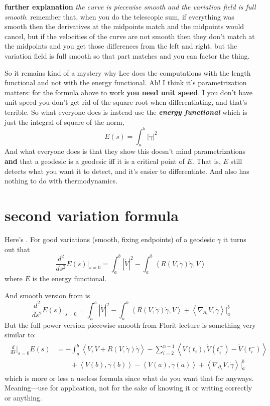 \textbf{further explanation} \textit{the curve is piecewise smooth and the variation field is full smooth}. remember that, when you do the telescopic sum, if everything was smooth then the derivatives at the midpoints match and the midpoints would cancel, but if the velocities of the curve are not smooth then they don't match at the midpoints and you get those differences from the left and right. but the variation field is full smooth so that part matches and you can factor the thing.

So it remains kind of a mystery why Lee does the computations with the length functional and not with the energy functional. Ah! I think it's parametrization matters: for the formula above to work \textbf{you need unit speed}. I you don't have unit speed you don't get rid of the square root when differentiating, and that's terrible. So what everyone does is instead use the \textit{\textbf{energy functional}} which is just the integral of square of the norm,
\[\boxed{E(s)=\int_a^b |\dot \gamma|^2}\]
And what everyone does is that they show this doesn't mind parametrizations \textbf{and} that a geodesic is a geodesic iff it is a critical point of \(E\). That is, \(E\) still detects what you want it to detect, and it's easier to differentiate. And also has nothing to do with thermodynamics.
\section{second variation formula}

Here's  \cite{pet}. For good variations (smooth, fixing endpoints) of a geodesic \(\gamma\) it turns out that
\[\boxed{\frac{d^2}{ds^2}E(s)\Big|_{s=0}=\int_a^b |\dot V|^2- \int_a^b \left<R(V,\dot \gamma)\dot \gamma,V\right>}\]
where \(E\) is the energy functional.

And smooth version from \cite{pet} is
\[\boxed{\frac{d^2}{ds^2}E(s)\Big|_{s=0}=\int_a^b |\dot V|^2-\int_a^b \left<R(V,\dot \gamma)\dot\gamma,V\right>+\left<\nabla_{\partial_s}V,\dot\gamma\right>|_{a}^b}\]
But the full power version piecewise smooth from Florit lecture is something very similar to:
\begin{align*}
	\boxed{\begin{array}{rl}\frac{d}{ds}\Big|_{s=0}E(s)&=-\int_a^b\left<V,\ddot V+R(V,\dot \gamma)\dot \gamma\right>-\sum_{i=2}^{n-1}\left<V(t_i),\dot V(t^+_{i})-\dot V(t^-_{i})\right>\\
				   & \qquad +\left<V(b),\dot\gamma(b)\right>-\left<V(a),\dot\gamma(a)\right>+\left<\nabla_{\partial_s}V,\dot\gamma\right>|_{a}^b\end{array}}
	\end{align*}
which is more or less a useless formula since what do you want that for anyways. Meaning---use for application, not for the sake of knowing it or writing correctly or anything.

